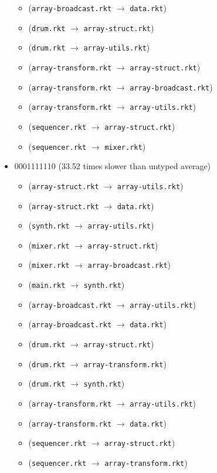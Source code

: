 \documentclass{article}
\newcommand{\mono}[1]{\texttt{#1}}
\begin{document}
\begin{itemize}
\begin{itemize}
  \item (\mono{array-broadcast.rkt} $\rightarrow$ \mono{data.rkt})
  \item (\mono{drum.rkt} $\rightarrow$ \mono{array-struct.rkt})
  \item (\mono{drum.rkt} $\rightarrow$ \mono{array-utils.rkt})
  \item (\mono{array-transform.rkt} $\rightarrow$ \mono{array-struct.rkt})
  \item (\mono{array-transform.rkt} $\rightarrow$ \mono{array-broadcast.rkt})
  \item (\mono{array-transform.rkt} $\rightarrow$ \mono{array-utils.rkt})
  \item (\mono{sequencer.rkt} $\rightarrow$ \mono{array-struct.rkt})
  \item (\mono{sequencer.rkt} $\rightarrow$ \mono{mixer.rkt})
  \end{itemize}
\item 0001111110 (33.52 times slower than untyped average)
  \begin{itemize}
  \item (\mono{array-struct.rkt} $\rightarrow$ \mono{array-utils.rkt})
  \item (\mono{array-struct.rkt} $\rightarrow$ \mono{data.rkt})
  \item (\mono{synth.rkt} $\rightarrow$ \mono{array-utils.rkt})
  \item (\mono{mixer.rkt} $\rightarrow$ \mono{array-struct.rkt})
  \item (\mono{mixer.rkt} $\rightarrow$ \mono{array-broadcast.rkt})
  \item (\mono{main.rkt} $\rightarrow$ \mono{synth.rkt})
  \item (\mono{array-broadcast.rkt} $\rightarrow$ \mono{array-utils.rkt})
  \item (\mono{array-broadcast.rkt} $\rightarrow$ \mono{data.rkt})
  \item (\mono{drum.rkt} $\rightarrow$ \mono{array-struct.rkt})
  \item (\mono{drum.rkt} $\rightarrow$ \mono{array-transform.rkt})
  \item (\mono{drum.rkt} $\rightarrow$ \mono{synth.rkt})
  \item (\mono{array-transform.rkt} $\rightarrow$ \mono{array-utils.rkt})
  \item (\mono{array-transform.rkt} $\rightarrow$ \mono{data.rkt})
  \item (\mono{sequencer.rkt} $\rightarrow$ \mono{array-struct.rkt})
  \item (\mono{sequencer.rkt} $\rightarrow$ \mono{array-transform.rkt})

\end{itemize}
\end{itemize}
\end{document}
